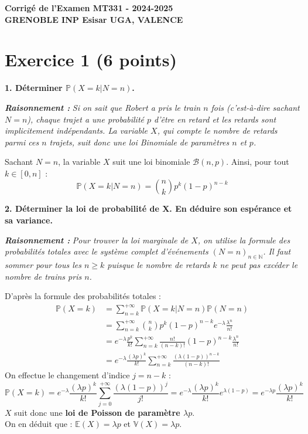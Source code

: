 \documentclass[11pt,a4paper]{article}
\newcommand{\raisonnement}[1]{
    \vspace{0.2cm}
    \noindent\textcolor{blue!70!black}{
        \textbf{\textit{Raisonnement : }} \textit{#1}
    }
    \vspace{0.2cm}
}
\begin{document}
\begin{center}
    \textbf{\Large Corrigé de l'Examen MT331 - 2024-2025} \\
    \vspace{0.2cm}
    \textbf{GRENOBLE INP Esisar UGA, VALENCE}
\end{center}

\vspace{0.5cm}

\section*{Exercice 1 (6 points)}

\textbf{1. Déterminer $\mathbb{P}(X=k|N=n)$.}
\raisonnement{Si on sait que Robert a pris le train $n$ fois (c'est-à-dire sachant $N=n$), chaque trajet a une probabilité $p$ d'être en retard et les retards sont implicitement indépendants. La variable $X$, qui compte le nombre de retards parmi ces $n$ trajets, suit donc une loi Binomiale de paramètres $n$ et $p$.}

Sachant $N=n$, la variable $X$ suit une loi binomiale $\mathcal{B}(n, p)$.
Ainsi, pour tout $k \in [0, n]$ :
$$ \mathbb{P}(X=k|N=n) = \binom{n}{k} p^k (1-p)^{n-k} $$

\textbf{2. Déterminer la loi de probabilité de X. En déduire son espérance et sa variance.}
\raisonnement{Pour trouver la loi marginale de $X$, on utilise la formule des probabilités totales avec le système complet d'événements $(N=n)_{n \in \mathbb{N}}$. Il faut sommer pour tous les $n \ge k$ puisque le nombre de retards $k$ ne peut pas excéder le nombre de trains pris $n$.}

D'après la formule des probabilités totales :
\begin{align*}
\mathbb{P}(X=k) &= \sum_{n=k}^{+\infty} \mathbb{P}(X=k|N=n)\mathbb{P}(N=n) \\
&= \sum_{n=k}^{+\infty} \binom{n}{k} p^k (1-p)^{n-k} e^{-\lambda} \frac{\lambda^n}{n!} \\
&= e^{-\lambda} \frac{p^k}{k!} \sum_{n=k}^{+\infty} \frac{n!}{(n-k)!} (1-p)^{n-k} \frac{\lambda^n}{n!} \\
&= e^{-\lambda} \frac{(\lambda p)^k}{k!} \sum_{n=k}^{+\infty} \frac{(\lambda(1-p))^{n-k}}{(n-k)!}
\end{align*}
On effectue le changement d'indice $j = n-k$ :
$$ \mathbb{P}(X=k) = e^{-\lambda} \frac{(\lambda p)^k}{k!} \sum_{j=0}^{+\infty} \frac{(\lambda(1-p))^j}{j!} = e^{-\lambda} \frac{(\lambda p)^k}{k!} e^{\lambda(1-p)} = e^{-\lambda p} \frac{(\lambda p)^k}{k!} $$
$X$ suit donc une \textbf{loi de Poisson de paramètre $\lambda p$}. \\
On en déduit que : $\mathbb{E}(X) = \lambda p$ et $\mathbb{V}(X) = \lambda p$.
\end{document}
